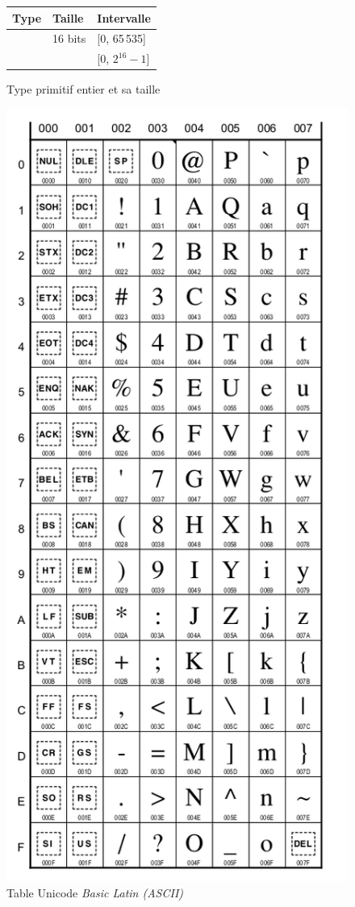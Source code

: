 \begin{figure}[h]
	\centering
	\begin{tabular}[h]{|l|l|p{9cm}|}
		\hline
		\rowcolor{black!20}
		\textbf{Type}	&	\textbf{Taille}	&	\textbf{Intervalle}	\\
		\hline
		\pc{char}	&	16 bits	&	[0, 65\,535]\\
		&			&	[$0$, $2^{16}-1$]\\
		\hline
	\end{tabular}	
	\caption{Type primitif entier  et sa taille}
	\label{fig:typeschar}
\end{figure}

\begin{figure}[t]
	\centering
	\includegraphics[width=.75\linewidth]{../images/unicode-latin-2.png}
	\caption{Table Unicode \textit{Basic Latin (ASCII)}}
	\label{fig:tableunicode}
\end{figure}

